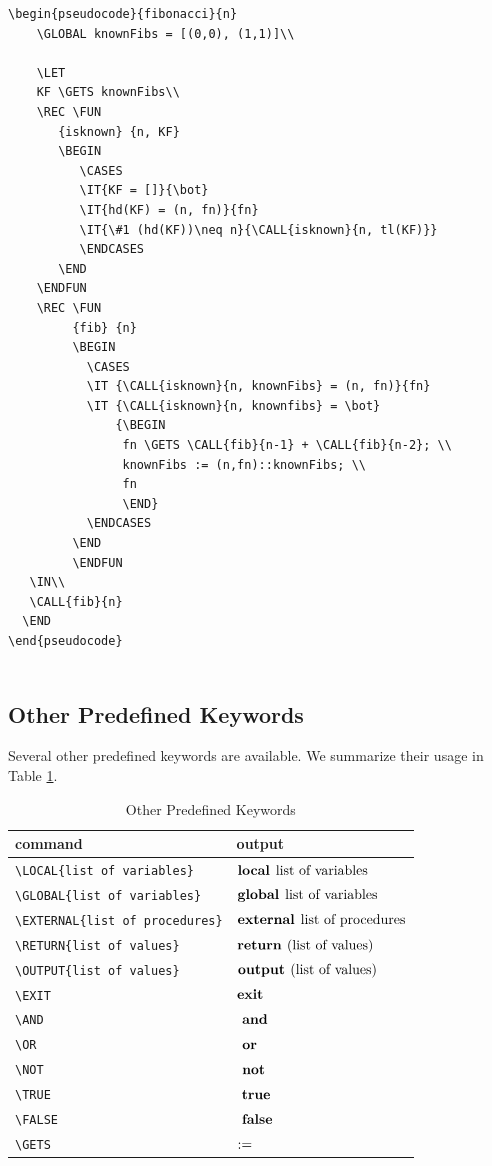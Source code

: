 \documentclass[a4]{article}
\begin{document}
\begin{verbatim}
\begin{pseudocode}{fibonacci}{n}
    \GLOBAL knownFibs = [(0,0), (1,1)]\\

    \LET
    KF \GETS knownFibs\\
    \REC \FUN
       {isknown} {n, KF}
       \BEGIN
          \CASES
          \IT{KF = []}{\bot}
          \IT{hd(KF) = (n, fn)}{fn}
          \IT{\#1 (hd(KF))\neq n}{\CALL{isknown}{n, tl(KF)}}
          \ENDCASES
       \END
    \ENDFUN
    \REC \FUN
         {fib} {n}
         \BEGIN
           \CASES
           \IT {\CALL{isknown}{n, knownFibs} = (n, fn)}{fn}
           \IT {\CALL{isknown}{n, knownfibs} = \bot}
               {\BEGIN
                fn \GETS \CALL{fib}{n-1} + \CALL{fib}{n-2}; \\ 
                knownFibs := (n,fn)::knownFibs; \\
                fn
                \END}
           \ENDCASES
         \END
         \ENDFUN
   \IN\\
   \CALL{fib}{n}
  \END
\end{pseudocode}
  
\end{verbatim}

\subsection{Other Predefined Keywords}

Several other predefined keywords are available.
We summarize their usage in Table \ref{otherPredefinedKeywords}.

\begin{table}[h]
\caption{Other Predefined Keywords}
\label{otherPredefinedKeywords}
\begin{center}
\begin{tabular}{@{}ll@{}}
\hline
command & output\\
\hline
\verb+\LOCAL{list of variables}+&
$\mbox{\bfseries local}\hspace*{1ex}\mbox{list of variables}$\\
\verb+\GLOBAL{list of variables}+&
$\mbox{\bfseries global}\hspace*{1ex}\mbox{list of variables}$\\
\verb+\EXTERNAL{list of procedures}+&
$\mbox{\bfseries external}\hspace*{1ex}\mbox{list of procedures}$\\
\verb+\RETURN{list of values}+&
$\RETURN{\mbox{list of values}}$\\
\verb+\OUTPUT{list of values}+&
$\mbox{\bfseries output }(\mbox{list of values})$\\
\verb+\EXIT+&
$\mbox{\bfseries exit }$\\
\verb+\AND+&
$\mbox{ \bfseries and }$\\
\verb+\OR+&
$\mbox{ \bfseries or }$\\
\verb+\NOT+&
$\mbox{ \bfseries not }$\\
\verb+\TRUE+&
$\mbox{ \bfseries true }$\\
\verb+\FALSE+&
$\mbox{ \bfseries false }$\\
\verb+\GETS+&
$:=$\\
\hline
\end{tabular}
\end{center}
\end{table}
\end{document}
